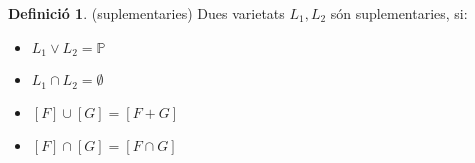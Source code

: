 \documentclass{article}
\theoremstyle{definition}
\newtheorem{definition}[theorem]{Definició}
\newcommand{\PP}{\mathbb{P}}
\begin{document}
\begin{definition}(suplementaries)
Dues varietats $L_1, L_2$ són suplementaries, si:
\begin{itemize}
\item $L_1 \vee L_2 = \PP$
\item $L_1 \cap L_2 = \emptyset$
\end{itemize}
\end{definition}

\begin{itemize}
\item $[F] \cup [G] = [F + G]$
\item $[F] \cap [G] = [F \cap G]$
\end{itemize}
\end{document}
